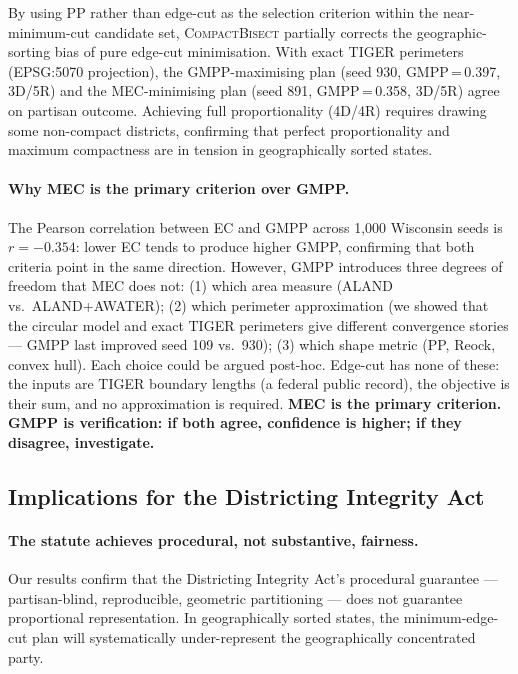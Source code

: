 By using PP rather than edge-cut as the selection criterion within the
near-minimum-cut candidate set, \textsc{CompactBisect} partially corrects
the geographic-sorting bias of pure edge-cut minimisation. With exact TIGER
perimeters (EPSG:5070 projection), the GMPP-maximising plan (seed 930,
GMPP\,=\,0.397, 3D/5R) and the MEC-minimising plan (seed 891, GMPP\,=\,0.358,
3D/5R) agree on partisan outcome. Achieving full proportionality (4D/4R)
requires drawing some non-compact districts, confirming that perfect
proportionality and maximum compactness are in tension in geographically
sorted states.

\paragraph{Why MEC is the primary criterion over GMPP.}
The Pearson correlation between EC and GMPP across 1{,}000 Wisconsin seeds
is $r = -0.354$: lower EC tends to produce higher GMPP, confirming that both
criteria point in the same direction. However, GMPP introduces three degrees
of freedom that MEC does not: (1) which area measure (ALAND vs.\ ALAND+AWATER);
(2) which perimeter approximation (we showed that the circular model and exact
TIGER perimeters give different convergence stories --- GMPP last improved seed
109 vs.\ 930); (3) which shape metric (PP, Reock, convex hull). Each choice
could be argued post-hoc. Edge-cut has none of these: the inputs are TIGER
boundary lengths (a federal public record), the objective is their sum, and no
approximation is required. \textbf{MEC is the primary criterion. GMPP is
verification: if both agree, confidence is higher; if they disagree, investigate.}

\subsection{Implications for the Districting Integrity Act}

\paragraph{The statute achieves procedural, not substantive, fairness.}
Our results confirm that the Districting Integrity Act's procedural guarantee
--- partisan-blind, reproducible, geometric partitioning --- does not guarantee
proportional representation. In geographically sorted states, the minimum-edge-cut
plan will systematically under-represent the geographically concentrated party.

